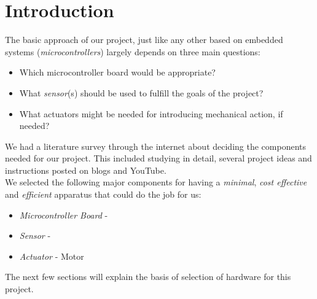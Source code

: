 \chapter{Introduction}\label{ch:introduction}
The basic approach of our project, just like any other based on embedded systems (\textit{microcontrollers}) largely depends on three main questions: 
\begin{itemize}
	\item Which microcontroller board would be appropriate?
	\item What \textit{sensor}(s) should be used to fulfill the goals of the project? 
	\item What actuators might be needed for introducing mechanical action, if needed? 
 
\end{itemize}

We had a literature survey through the internet about deciding the components needed for our project. This included studying in detail, several project ideas and instructions posted on blogs and YouTube.\\
We selected the following major components for having a \textsl{minimal}, \textsl{cost effective} and \textsl{efficient} apparatus that could do the job for us:
\begin{itemize}
	\item \textit{Microcontroller Board} - \arduinouno{}
	\item \textit{Sensor} - \hcsr{} \ultrasonic{}
	\item \textit{Actuator} - \servo{} Motor

\end{itemize}
The next few sections will explain the basis of selection of hardware for this project.


